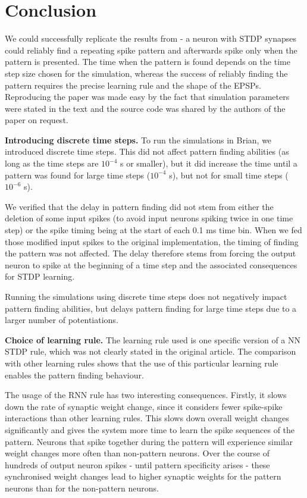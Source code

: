 \documentclass[10pt,a4paper,onecolumn]{article}
\begin{document}
\section{Conclusion}\label{conclusion}

We could successfully replicate the results from \textcite{Masq2008} - a
neuron with STDP synapses could reliably find a repeating spike pattern
and afterwards spike only when the pattern is presented. The time when
the pattern is found depends on the time step size chosen for the
simulation, whereas the success of reliably finding the pattern requires
the precise learning rule and the shape of the EPSPs. Reproducing the
paper was made easy by the fact that simulation parameters were stated
in the text and the source code was shared by the authors of the paper
on request.

\textbf{Introducing discrete time steps.} To run the simulations in
Brian, we introduced discrete time steps. This did not affect pattern
finding abilities (as long as the time steps are \(10^{-4}\) s or
smaller), but it did increase the time until a pattern was found for
large time steps (\(10^{-4}\) s), but not for small time steps
(\(10^{-6}\) s).

We verified that the delay in pattern finding did not stem from either
the deletion of some input spikes (to avoid input neurons spiking twice
in one time step) or the spike timing being at the start of each 0.1 ms
time bin. When we fed those modified input spikes to the original
implementation, the timing of finding the pattern was not affected. The
delay therefore stems from forcing the output neuron to spike at the
beginning of a time step and the associated consequences for STDP
learning.

Running the simulations using discrete time steps does not negatively
impact pattern finding abilities, but delays pattern finding for large
time steps due to a larger number of potentiations.

\textbf{Choice of learning rule.} The learning rule used is one specific
version of a NN STDP rule, which was not clearly stated in the original
article. The comparison with other learning rules shows that the use of
this particular learning rule enables the pattern finding behaviour.

The usage of the RNN rule has two interesting consequences. Firstly, it
slows down the rate of synaptic weight change, since it considers fewer
spike-spike interactions than other learning rules. This slows down
overall weight changes significantly and gives the system more time to
learn the spike sequences of the pattern. Neurons that spike together
during the pattern will experience similar weight changes more often
than non-pattern neurons. Over the course of hundreds of output neuron
spikes - until pattern specificity arises - these synchronised weight
changes lead to higher synaptic weights for the pattern neurons than for
the non-pattern neurons.
\end{document}
